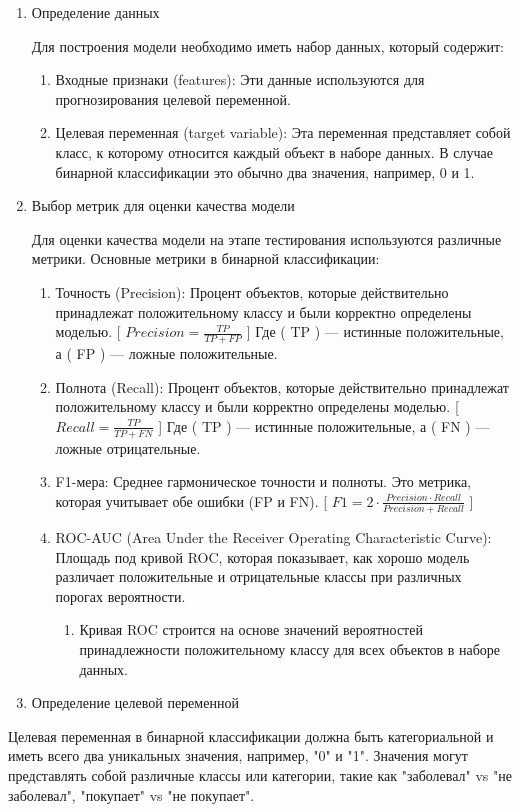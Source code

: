 \begin{enumerate}
\item Определение данных

\par Для построения модели необходимо иметь набор данных, который содержит:

\begin{enumerate}
\item Входные признаки (features): Эти данные используются для прогнозирования целевой переменной.
\item Целевая переменная (target variable): Эта переменная представляет собой класс, к которому относится каждый объект в наборе данных. В случае бинарной классификации это обычно два значения, например, 0 и 1.
\end{enumerate}

\item Выбор метрик для оценки качества модели

Для оценки качества модели на этапе тестирования используются различные метрики. Основные метрики в бинарной классификации:

\begin{enumerate}
\item Точность (Precision): Процент объектов, которые действительно принадлежат положительному классу и были корректно определены моделью. [ $Precision = \frac{TP}{TP + FP}$ ] Где ( TP ) — истинные положительные, а ( FP ) — ложные положительные.
\item Полнота (Recall): Процент объектов, которые действительно принадлежат положительному классу и были корректно определены моделью. [ $Recall = \frac{TP}{TP + FN}$ ] Где ( TP ) — истинные положительные, а ( FN ) — ложные отрицательные.
\item F1-мера: Среднее гармоническое точности и полноты. Это метрика, которая учитывает обе ошибки (FP и FN). [ $F1 = 2 \cdot \frac{Precision \cdot Recall}{Precision + Recall}$ ]
\item ROC-AUC (Area Under the Receiver Operating Characteristic Curve): Площадь под кривой ROC, которая показывает, как хорошо модель различает положительные и отрицательные классы при различных порогах вероятности.
\begin{enumerate}
\item Кривая ROC строится на основе значений вероятностей принадлежности положительному классу для всех объектов в наборе данных.
\end{enumerate}

\end{enumerate}

\item Определение целевой переменной
\end{enumerate}
Целевая переменная в бинарной классификации должна быть категориальной и иметь всего два уникальных значения, например, "0" и "1". Значения могут представлять собой различные классы или категории, такие как "заболевал" vs "не заболевал", "покупает" vs "не покупает".

